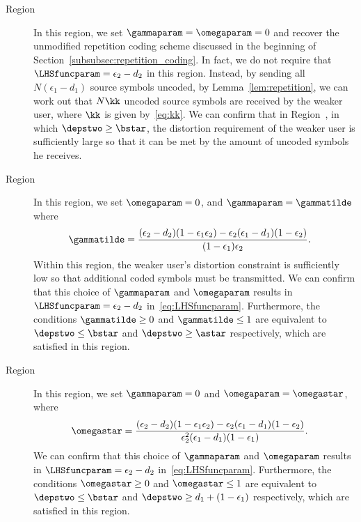 \begin{description}
	\item[Region~] In this region, we set $\gammaparam = \omegaparam = 0$ and recover the unmodified repetition coding scheme discussed in the beginning of Section~\ref{subsubsec:repetition_coding}.  In fact, we do not require that $\LHSfuncparam = \epsilon_2 - d_2$ in this region.  Instead, by sending all $N(\epsilon_1 - d_1)$ source symbols uncoded, by Lemma~\ref{lem:repetition}, we can work out that $N\kk$ uncoded source symbols are received by the weaker user, where $\kk$ is given by~\eqref{eq:kk}.  We can confirm that in Region~, in which $\depstwo \geq \bstar$, the distortion requirement of the weaker user is sufficiently large so that it can be met by the amount of uncoded symbols he receives.
	\item[Region~] In this region, we set $\omegaparam = 0$, and $\gammaparam = \gammatilde$ where 
		\begin{align}
			\gammatilde &= \frac{(\epsilon_2 - d_2)(1 - \epsilon_1\epsilon_2) - \epsilon_2(\epsilon_1 - d_1)(1 - \epsilon_2)}{(1 - \epsilon_1)\epsilon_2}.
			\label{eq:gammatilde}
		\end{align}
		Within this region, the weaker user's distortion constraint is sufficiently low so that additional coded symbols must be transmitted.  We can confirm that this choice of $\gammaparam$ and $\omegaparam$ results in $\LHSfuncparam = \epsilon_2 - d_2$ in~\eqref{eq:LHSfuncparam}.  Furthermore, the conditions $\gammatilde \geq 0$ and $\gammatilde \leq 1$ are equivalent to $\depstwo \leq \bstar$ and $\depstwo \geq \astar$ respectively, which are satisfied in this region.
	\item [Region~]  In this region, we set $\gammaparam = 0$ and $\omegaparam = \omegastar$, where
		\begin{align}
			\omegastar &= \frac{(\epsilon_2 - d_2)(1 - \epsilon_1\epsilon_2) - \epsilon_2(\epsilon_1 - d_1)(1 - \epsilon_2)}{\epsilon_{2}^{2}(\epsilon_1 - d_1)(1 - \epsilon_1)}.
		\end{align}
		We can confirm that this choice of $\gammaparam$ and $\omegaparam$ results in $\LHSfuncparam = \epsilon_2 - d_2$ in~\eqref{eq:LHSfuncparam}.  Furthermore, the conditions $\omegastar \geq 0$ and $\omegastar \leq 1$ are equivalent to $\depstwo \leq \bstar$ and $\depstwo \geq d_1 + (1 - \epsilon_1)$ respectively, which are satisfied in this region.%
	

\end{description}
